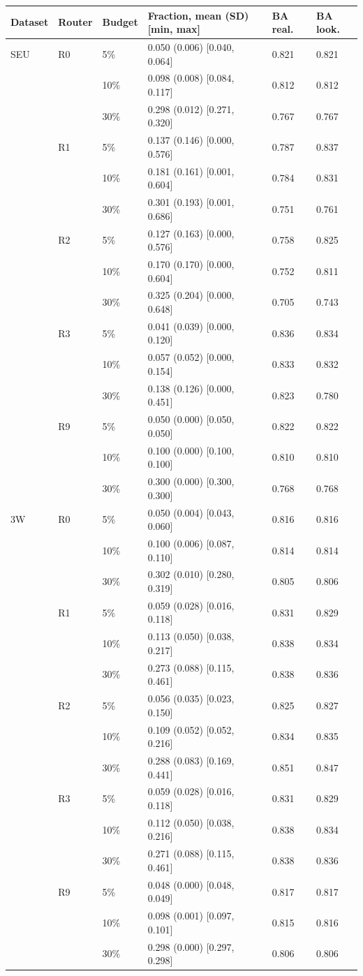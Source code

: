 \begin{tabular}{@{}l l l lll@{}}
\toprule
Dataset & Router & Budget & Fraction, mean (SD) [min, max] & BA real. & BA look. \\
\midrule
SEU & R0 & 5\% & 0.050 (0.006) [0.040, 0.064] & 0.821 & 0.821 \\
 &  & 10\% & 0.098 (0.008) [0.084, 0.117] & 0.812 & 0.812 \\
 &  & 30\% & 0.298 (0.012) [0.271, 0.320] & 0.767 & 0.767 \\
 & R1 & 5\% & 0.137 (0.146) [0.000, 0.576] & 0.787 & 0.837 \\
 &  & 10\% & 0.181 (0.161) [0.001, 0.604] & 0.784 & 0.831 \\
 &  & 30\% & 0.301 (0.193) [0.001, 0.686] & 0.751 & 0.761 \\
 & R2 & 5\% & 0.127 (0.163) [0.000, 0.576] & 0.758 & 0.825 \\
 &  & 10\% & 0.170 (0.170) [0.000, 0.604] & 0.752 & 0.811 \\
 &  & 30\% & 0.325 (0.204) [0.000, 0.648] & 0.705 & 0.743 \\
 & R3 & 5\% & 0.041 (0.039) [0.000, 0.120] & 0.836 & 0.834 \\
 &  & 10\% & 0.057 (0.052) [0.000, 0.154] & 0.833 & 0.832 \\
 &  & 30\% & 0.138 (0.126) [0.000, 0.451] & 0.823 & 0.780 \\
 & R9 & 5\% & 0.050 (0.000) [0.050, 0.050] & 0.822 & 0.822 \\
 &  & 10\% & 0.100 (0.000) [0.100, 0.100] & 0.810 & 0.810 \\
 &  & 30\% & 0.300 (0.000) [0.300, 0.300] & 0.768 & 0.768 \\
\addlinespace
3W & R0 & 5\% & 0.050 (0.004) [0.043, 0.060] & 0.816 & 0.816 \\
 &  & 10\% & 0.100 (0.006) [0.087, 0.110] & 0.814 & 0.814 \\
 &  & 30\% & 0.302 (0.010) [0.280, 0.319] & 0.805 & 0.806 \\
 & R1 & 5\% & 0.059 (0.028) [0.016, 0.118] & 0.831 & 0.829 \\
 &  & 10\% & 0.113 (0.050) [0.038, 0.217] & 0.838 & 0.834 \\
 &  & 30\% & 0.273 (0.088) [0.115, 0.461] & 0.838 & 0.836 \\
 & R2 & 5\% & 0.056 (0.035) [0.023, 0.150] & 0.825 & 0.827 \\
 &  & 10\% & 0.109 (0.052) [0.052, 0.216] & 0.834 & 0.835 \\
 &  & 30\% & 0.288 (0.083) [0.169, 0.441] & 0.851 & 0.847 \\
 & R3 & 5\% & 0.059 (0.028) [0.016, 0.118] & 0.831 & 0.829 \\
 &  & 10\% & 0.112 (0.050) [0.038, 0.216] & 0.838 & 0.834 \\
 &  & 30\% & 0.271 (0.088) [0.115, 0.461] & 0.838 & 0.836 \\
 & R9 & 5\% & 0.048 (0.000) [0.048, 0.049] & 0.817 & 0.817 \\
 &  & 10\% & 0.098 (0.001) [0.097, 0.101] & 0.815 & 0.816 \\
 &  & 30\% & 0.298 (0.000) [0.297, 0.298] & 0.806 & 0.806 \\
\bottomrule
\end{tabular}
